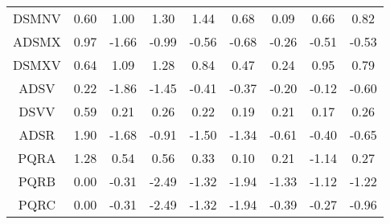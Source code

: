 \documentclass[11pt,a4paper]{report}
\begin{document}
\begin{longtable}{ | c || c | c | c | c | c | c | c || c |}
DSMNV &  \cellcolor[HTML]{EFEFFF} 0.60 &  \cellcolor[HTML]{E7E7FF} 1.00 &  \cellcolor[HTML]{DFDFFF} 1.30 &  \cellcolor[HTML]{D7D7FF} 1.44 &  \cellcolor[HTML]{EFEFFF} 0.68 &  \cellcolor[HTML]{FFFFFF} 0.09 &  \cellcolor[HTML]{EFEFFF} 0.66 &  \cellcolor[HTML]{E7E7FF} 0.82 \\
ADSMX &  \cellcolor[HTML]{E7E7FF} 0.97 &  \cellcolor[HTML]{FFD7D7} -1.66 &  \cellcolor[HTML]{FFE7E7} -0.99 &  \cellcolor[HTML]{FFEFEF} -0.56 &  \cellcolor[HTML]{FFEFEF} -0.68 &  \cellcolor[HTML]{FFF7F7} -0.26 &  \cellcolor[HTML]{FFEFEF} -0.51 &  \cellcolor[HTML]{FFEFEF} -0.53 \\
DSMXV &  \cellcolor[HTML]{EFEFFF} 0.64 &  \cellcolor[HTML]{E7E7FF} 1.09 &  \cellcolor[HTML]{DFDFFF} 1.28 &  \cellcolor[HTML]{E7E7FF} 0.84 &  \cellcolor[HTML]{F7F7FF} 0.47 &  \cellcolor[HTML]{F7F7FF} 0.24 &  \cellcolor[HTML]{E7E7FF} 0.95 &  \cellcolor[HTML]{EFEFFF} 0.79 \\
ADSV &  \cellcolor[HTML]{F7F7FF} 0.22 &  \cellcolor[HTML]{FFCFCF} -1.86 &  \cellcolor[HTML]{FFD7D7} -1.45 &  \cellcolor[HTML]{FFF7F7} -0.41 &  \cellcolor[HTML]{FFF7F7} -0.37 &  \cellcolor[HTML]{FFF7F7} -0.20 &  \cellcolor[HTML]{FFFFFF} -0.12 &  \cellcolor[HTML]{FFEFEF} -0.60 \\
DSVV &  \cellcolor[HTML]{EFEFFF} 0.59 &  \cellcolor[HTML]{F7F7FF} 0.21 &  \cellcolor[HTML]{F7F7FF} 0.26 &  \cellcolor[HTML]{F7F7FF} 0.22 &  \cellcolor[HTML]{F7F7FF} 0.19 &  \cellcolor[HTML]{F7F7FF} 0.21 &  \cellcolor[HTML]{F7F7FF} 0.17 &  \cellcolor[HTML]{F7F7FF} 0.26 \\
ADSR &  \cellcolor[HTML]{CFCFFF} 1.90 &  \cellcolor[HTML]{FFD7D7} -1.68 &  \cellcolor[HTML]{FFE7E7} -0.91 &  \cellcolor[HTML]{FFD7D7} -1.50 &  \cellcolor[HTML]{FFDFDF} -1.34 &  \cellcolor[HTML]{FFEFEF} -0.61 &  \cellcolor[HTML]{FFF7F7} -0.40 &  \cellcolor[HTML]{FFEFEF} -0.65 \\
PQRA &  \cellcolor[HTML]{DFDFFF} 1.28 &  \cellcolor[HTML]{EFEFFF} 0.54 &  \cellcolor[HTML]{EFEFFF} 0.56 &  \cellcolor[HTML]{F7F7FF} 0.33 &  \cellcolor[HTML]{FFFFFF} 0.10 &  \cellcolor[HTML]{F7F7FF} 0.21 &  \cellcolor[HTML]{FFDFDF} -1.14 &  \cellcolor[HTML]{F7F7FF} 0.27 \\
PQRB &  \cellcolor[HTML]{FFFFFF} 0.00 &  \cellcolor[HTML]{FFF7F7} -0.31 &  \cellcolor[HTML]{FFBFBF} -2.49 &  \cellcolor[HTML]{FFDFDF} -1.32 &  \cellcolor[HTML]{FFCFCF} -1.94 &  \cellcolor[HTML]{FFDFDF} -1.33 &  \cellcolor[HTML]{FFDFDF} -1.12 &  \cellcolor[HTML]{FFDFDF} -1.22 \\
PQRC &  \cellcolor[HTML]{FFFFFF} 0.00 &  \cellcolor[HTML]{FFF7F7} -0.31 &  \cellcolor[HTML]{FFBFBF} -2.49 &  \cellcolor[HTML]{FFDFDF} -1.32 &  \cellcolor[HTML]{FFCFCF} -1.94 &  \cellcolor[HTML]{FFF7F7} -0.39 &  \cellcolor[HTML]{FFF7F7} -0.27 &  \cellcolor[HTML]{FFE7E7} -0.96 \\

\end{longtable}
\end{document}
